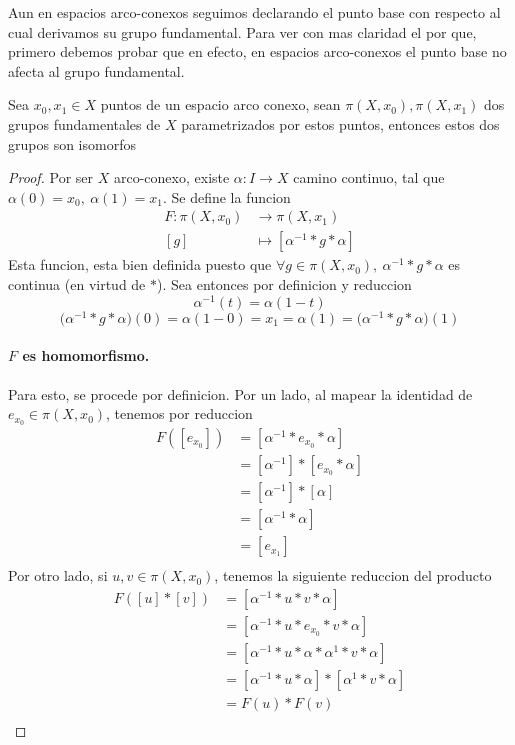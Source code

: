 Aun en espacios arco-conexos seguimos declarando el punto base con
respecto al cual derivamos su grupo fundamental. Para ver con mas
claridad el por que, primero debemos probar que en efecto, en espacios
arco-conexos el punto base no afecta al grupo fundamental.
\begin{teorema}
  Sea \(x_0 , x_1 \in X\) puntos de un espacio arco conexo, sean \(\pi
  (X, x_0), \pi (X, x_1)\) dos grupos fundamentales de \(X\)
  parametrizados por estos puntos, entonces estos dos grupos son isomorfos
\end{teorema}
\begin{proof}
  Por ser \(X\) arco-conexo, existe \(\alpha : I \to X\) camino
  continuo, tal que \(\alpha (0) = x_0,\ \alpha (1) = x_1\). Se define
  la funcion
  \begin{align*}
    F : \pi (X, x_0) &\to \pi (X, x_1) \\
    [g] &\mapsto [ \alpha^{-1} * g * \alpha ]
  \end{align*}
  Esta funcion, esta bien definida puesto que \(\forall g \in \pi (X,
  x_0),\ \alpha^{-1} * g * \alpha \) es continua (en virtud de \(*\)).
  Sea entonces por definicion y reduccion
  \[ \alpha^{-1} (t) = \alpha (1 - t)\]
  \[\big(\alpha^{-1} * g * \alpha \big) (0) = \alpha (1 - 0) = x_1 = \alpha (1) =
    \big(\alpha^{-1} * g * \alpha \big) (1)\]

  \paragraph{\(F\) es homomorfismo.} Para esto, se procede por
  definicion. Por un lado, al mapear la identidad de \(e_{x_0} \in \pi
  (X, x_0) \), tenemos por reduccion
  \begin{align*}
    F ([e_{x_0}]) &= [\alpha^{-1} * e_{x_0} * \alpha] \\
                 &= [\alpha^{-1}] * [e_{x_0} * \alpha] \\
                 &= [\alpha^{-1}] * [\alpha] \\
                 &= [\alpha^{-1} * \alpha] \\
                 &= [e_{x_1}] \\
  \end{align*}
  Por otro lado, si \(u,v \in \pi (X, x_0) \), tenemos la siguiente
  reduccion del producto
  \begin{align*}
    F ([u] * [v]) &= [\alpha^{-1} * u * v * \alpha] \\
    &= [\alpha^{-1} * u * e_{x_0} * v * \alpha] \\
    &= [\alpha^{-1} * u * \alpha * \alpha^{1} * v * \alpha] \\
    &= [\alpha^{-1} * u * \alpha ] * [ \alpha^{1} * v * \alpha] \\
    &= F (u) * F (v) \\
  \end{align*}


\end{proof}

